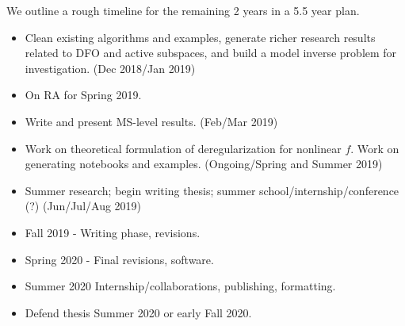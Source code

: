 \documentclass{amsart}
\begin{document}
We outline a rough timeline for the remaining 2 years in a 5.5 year plan.

\begin{itemize}

\item Clean existing algorithms and examples, generate richer research results related to DFO and active subspaces, and build a model inverse problem for investigation. (Dec 2018/Jan 2019)

\item On RA for Spring 2019.

\item Write and present MS-level results. (Feb/Mar 2019)

\item Work on theoretical formulation of deregularization for nonlinear $f$. Work on generating notebooks and examples. (Ongoing/Spring and Summer 2019)

\item Summer research; begin writing thesis; summer school/internship/conference (?) (Jun/Jul/Aug 2019)

\item Fall 2019 - Writing phase, revisions.

\item Spring 2020 - Final revisions, software.

\item Summer 2020 Internship/collaborations, publishing, formatting.

\item Defend thesis Summer 2020 or early Fall 2020.


\end{itemize}
\end{document}
